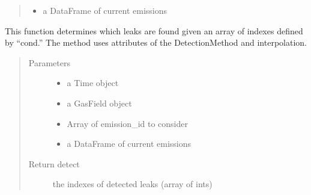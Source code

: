 \documentclass[letterpaper,10pt,english]{sphinxmanual}
\begin{document}
\begin{fulllineitems}
\begin{fulllineitems}
\begin{quote}
\begin{description}
\begin{itemize}
\item {} 
 \textendash{} a DataFrame of current emissions

\end{itemize}

\end{description}\end{quote}

\end{fulllineitems}


\begin{fulllineitems}
\label{\detokenize{index:feast.DetectionModules.comp_survey.CompSurvey.detect_prob_curve}}
This function determines which leaks are found given an array of indexes defined by “cond.”
The method uses attributes of the DetectionMethod and interpolation.
\begin{quote}\begin{description}
\item[{Parameters}] \leavevmode\begin{itemize}
\item {} 
 \textendash{} a Time object

\item {} 
 \textendash{} a GasField object

\item {} 
 \textendash{} Array of emission\_id to consider

\item {} 
 \textendash{} a DataFrame of current emissions

\end{itemize}

\item[{Return detect}] \leavevmode
the indexes of detected leaks (array of ints)

\end{description}\end{quote}

\end{fulllineitems}


\end{fulllineitems}
\end{document}
